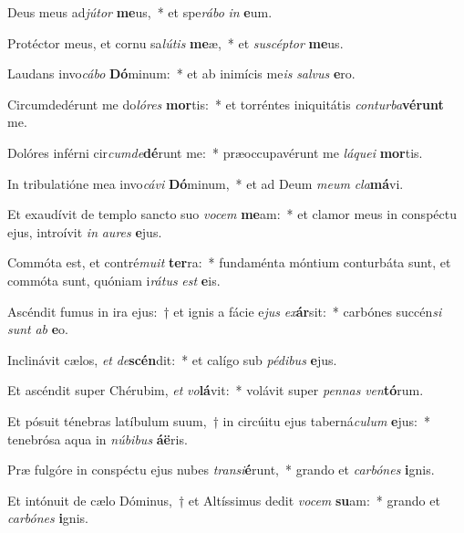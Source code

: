 \item Deus meus ad\textit{jú}\textit{tor} \textbf{me}us,~* et spe\textit{rá}\textit{bo} \textit{in} \textbf{e}um.
\item Protéctor meus, et cornu sa\textit{lú}\textit{tis} \textbf{me}æ,~* et \textit{su}\textit{scép}\textit{tor} \textbf{me}us.
\item Laudans invo\textit{cá}\textit{bo} \textbf{Dó}minum:~* et ab inimícis me\textit{is} \textit{sal}\textit{vus} \textbf{e}ro.
\item Circumdedérunt me do\textit{ló}\textit{res} \textbf{mor}tis:~* et torréntes iniquitátis \textit{con}\textit{tur}\textit{ba}\textbf{vé}\textbf{runt} me.
\item Dolóres inférni cir\textit{cum}\textit{de}\textbf{dé}runt me:~* præoccupavérunt me \textit{lá}\textit{que}\textit{i} \textbf{mor}tis.
\item In tribulatióne mea invo\textit{cá}\textit{vi} \textbf{Dó}minum,~* et ad Deum \textit{me}\textit{um} \textit{cla}\textbf{má}vi.
\item Et exaudívit de templo sancto suo \textit{vo}\textit{cem} \textbf{me}am:~* et clamor meus in conspéctu ejus, introívit \textit{in} \textit{au}\textit{res} \textbf{e}jus.
\item Commóta est, et contré\textit{mu}\textit{it} \textbf{ter}ra:~* fundaménta móntium conturbáta sunt, et commóta sunt, quóniam i\textit{rá}\textit{tus} \textit{est} \textbf{e}is.
\item Ascéndit fumus in ira ejus:~† et ignis a fácie e\textit{jus} \textit{ex}\textbf{ár}sit:~* carbónes succén\textit{si} \textit{sunt} \textit{ab} \textbf{e}o.
\item Inclinávit cælos, \textit{et} \textit{de}\textbf{scén}dit:~* et calígo sub \textit{pé}\textit{di}\textit{bus} \textbf{e}jus.
\item Et ascéndit super Chérubim, \textit{et} \textit{vo}\textbf{lá}vit:~* volávit super \textit{pen}\textit{nas} \textit{ven}\textbf{tó}rum.
\item Et pósuit ténebras latíbulum suum,~† in circúitu ejus taberná\textit{cu}\textit{lum} \textbf{e}jus:~* tenebrósa aqua in \textit{nú}\textit{bi}\textit{bus} \textbf{á}\textbf{ë}ris.
\item Præ fulgóre in conspéctu ejus nubes \textit{trans}\textit{i}\textbf{é}runt,~* grando et \textit{car}\textit{bó}\textit{nes} \textbf{i}gnis.
\item Et intónuit de cælo Dóminus,~† et Altíssimus dedit \textit{vo}\textit{cem} \textbf{su}am:~* grando et \textit{car}\textit{bó}\textit{nes} \textbf{i}gnis.

